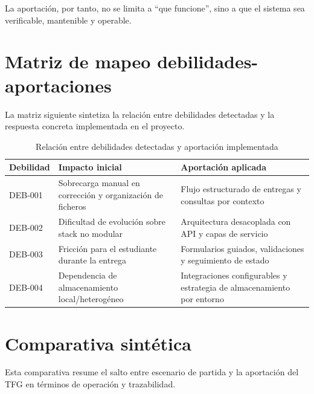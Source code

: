 La aportaci\'on, por tanto, no se limita a ``que funcione'',
sino a que el sistema sea verificable, mantenible y operable.

\FloatBarrier
\section{Matriz de mapeo debilidades-aportaciones}

La matriz siguiente sintetiza la relaci\'on entre debilidades detectadas
y la respuesta concreta implementada en el proyecto.

\begin{table}[!htbp]
\centering
\begin{tabular}{|P{2.5cm}|P{4.5cm}|P{4.9cm}|}
\hline
\textbf{Debilidad} & \textbf{Impacto inicial} & \textbf{Aportaci\'on aplicada} \\
\hline
DEB-001 & Sobrecarga manual en correcci\'on y organizaci\'on de ficheros & Flujo estructurado de entregas y consultas por contexto \\
\hline
DEB-002 & Dificultad de evoluci\'on sobre stack no modular & Arquitectura desacoplada con API y capas de servicio \\
\hline
DEB-003 & Fricci\'on para el estudiante durante la entrega & Formularios guiados, validaciones y seguimiento de estado \\
\hline
DEB-004 & Dependencia de almacenamiento local/heterog\'eneo & Integraciones configurables y estrategia de almacenamiento por entorno \\
\hline
\end{tabular}
\caption{Relaci\'on entre debilidades detectadas y aportaci\'on implementada}
\label{tab:mapeo-debilidades-aportacion}
\end{table}

\FloatBarrier
\section{Comparativa sint\'etica}

Esta comparativa resume el salto entre escenario de partida y la
aportaci\'on del TFG en t\'erminos de operaci\'on y trazabilidad.


